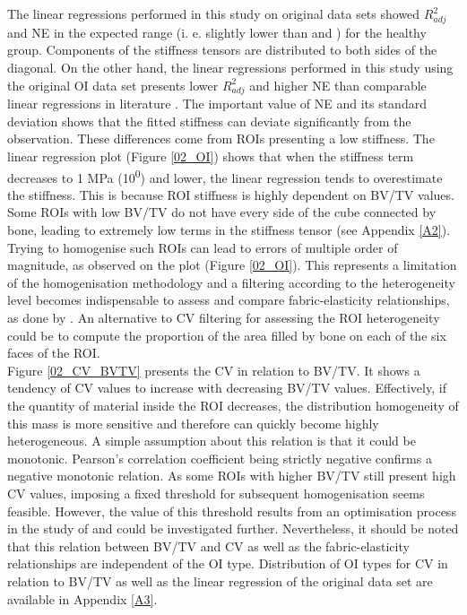 \documentclass[a4paper,fleqn]{DC_ArtStyle}
\begin{document}
	The linear regressions performed in this study on original data sets showed $R^2_{adj}$ and NE in the expected range (i. e. slightly lower than \citeauthor{Gross2013}\cite{Gross2013} and \citeauthor{Panyasantisuk2015}\cite{Panyasantisuk2015}) for the healthy group. Components of the stiffness tensors are distributed to both sides of the diagonal. On the other hand, the linear regressions performed in this study using the original OI data set presents lower $R^2_{adj}$ and higher NE than comparable linear regressions in literature \cite{Gross2013,Panyasantisuk2015}. The important value of NE and its standard deviation shows that the fitted stiffness can deviate significantly from the observation. These differences come from ROIs presenting a low stiffness. The linear regression plot (Figure \ref{02_OI}) shows that when the stiffness term decreases to 1 MPa (10\textsuperscript{0}) and lower, the linear regression tends to overestimate the stiffness. This is because ROI stiffness is highly dependent on BV/TV values. Some ROIs with low BV/TV do not have every side of the cube connected by bone, leading to extremely low terms in the stiffness tensor (see Appendix \ref{A2}). Trying to homogenise such ROIs can lead to errors of multiple order of magnitude, as observed on the plot (Figure \ref{02_OI}). This represents a limitation of the homogenisation methodology and a filtering according to the heterogeneity level becomes indispensable to assess and compare fabric-elasticity relationships, as done by \citeauthor{Panyasantisuk2015} \cite{Panyasantisuk2015}. An alternative to CV filtering for assessing the ROI heterogeneity could be to compute the proportion of the area filled by bone on each of the six faces of the ROI. \\
	
	Figure \ref{02_CV_BVTV} presents the CV in relation to BV/TV. It shows a tendency of CV values to increase with decreasing BV/TV values. Effectively, if the quantity of material inside the ROI decreases, the distribution homogeneity of this mass is more sensitive and therefore can quickly become highly heterogeneous. A simple assumption about this relation is that it could be monotonic. Pearson's correlation coefficient being strictly negative confirms a negative monotonic relation. As some ROIs with higher BV/TV still present high CV values, imposing a fixed threshold for subsequent homogenisation seems feasible. However, the value of this threshold results from an optimisation process in the study of \citeauthor{Panyasantisuk2015}\cite{Panyasantisuk2015} and could be investigated further. Nevertheless, it should be noted that this relation between BV/TV and CV as well as the fabric-elasticity relationships are independent of the OI type. Distribution of OI types for CV in relation to BV/TV as well as the linear regression of the original data set are available in Appendix \ref{A3}. \\
	
\end{document}

